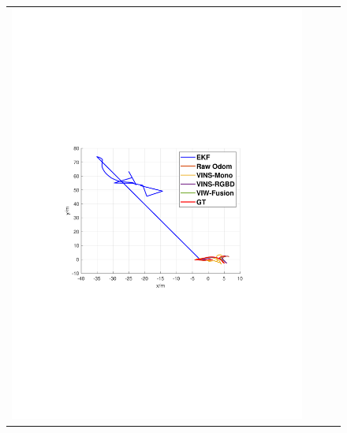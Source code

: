 \documentclass[conference]{IEEEtran}
\begin{document}
\begin{figure}
\begin{center}
\begin{tabular}{cccc}
				\includegraphics[scale=0.26]{fig/wall2.pdf}
				

\end{tabular}
\end{center}
\end{figure}
\end{document}
